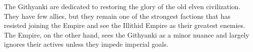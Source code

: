 The Githyanki are dedicated to restoring the glory of the old elven civilization.
They have few allies, but they remain one of the strongest factions that has resisted joining the Empire and see the Illithid Empire as their greatest enemies.
The Empire, on the other hand, sees the Githyanki as a minor nuance and largely ignores their actives unless they impede imperial goals.
